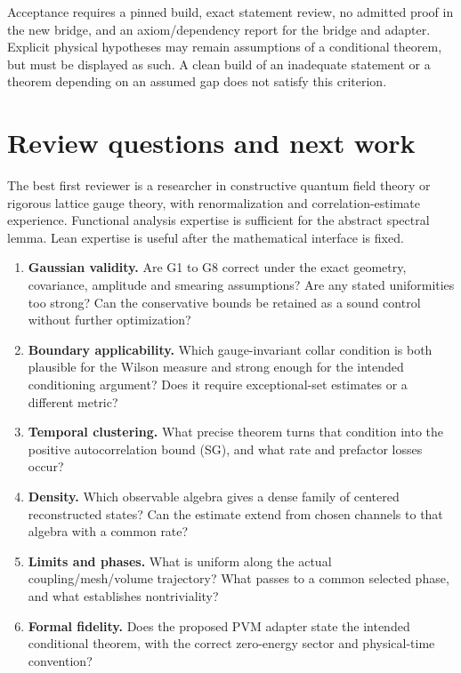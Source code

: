 \documentclass[
  11pt,
  letterpaper,
]{article}
\providecommand{\tightlist}{%
  \setlength{\itemsep}{0pt}\setlength{\parskip}{0pt}}
\begin{document}
Acceptance requires a pinned build, exact statement review, no admitted
proof in the new bridge, and an axiom/dependency report for the bridge
and adapter. Explicit physical hypotheses may remain assumptions of a
conditional theorem, but must be displayed as such. A clean build of an
inadequate statement or a theorem depending on an assumed gap does not
satisfy this criterion.

\section{Review questions and next
work}\label{review-questions-and-next-work}

The best first reviewer is a researcher in constructive quantum field
theory or rigorous lattice gauge theory, with renormalization and
correlation-estimate experience. Functional analysis expertise is
sufficient for the abstract spectral lemma. Lean expertise is useful
after the mathematical interface is fixed.

\begin{enumerate}
\def\labelenumi{\arabic{enumi}.}
\tightlist
\item
  \textbf{Gaussian validity.} Are G1 to G8 correct under the exact
  geometry, covariance, amplitude and smearing assumptions? Are any
  stated uniformities too strong? Can the conservative bounds be
  retained as a sound control without further optimization?
\item
  \textbf{Boundary applicability.} Which gauge-invariant collar
  condition is both plausible for the Wilson measure and strong enough
  for the intended conditioning argument? Does it require
  exceptional-set estimates or a different metric?
\item
  \textbf{Temporal clustering.} What precise theorem turns that
  condition into the positive autocorrelation bound (SG), and what rate
  and prefactor losses occur?
\item
  \textbf{Density.} Which observable algebra gives a dense family of
  centered reconstructed states? Can the estimate extend from chosen
  channels to that algebra with a common rate?
\item
  \textbf{Limits and phases.} What is uniform along the actual
  coupling/mesh/volume trajectory? What passes to a common selected
  phase, and what establishes nontriviality?
\item
  \textbf{Formal fidelity.} Does the proposed PVM adapter state the
  intended conditional theorem, with the correct zero-energy sector and
  physical-time convention?
\end{enumerate}
\end{document}
